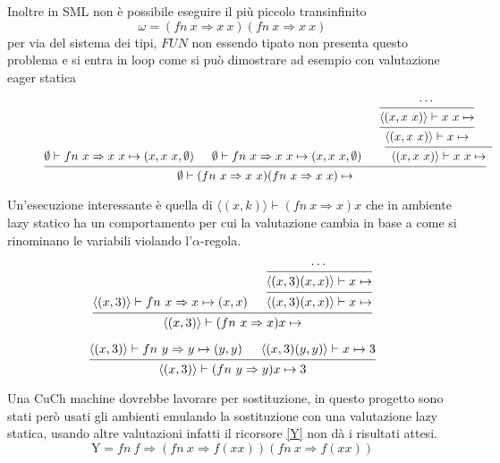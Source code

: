 \documentclass[a4paper]{article}
\begin{document}
	Inoltre in SML non è possibile eseguire il più piccolo transinfinito 
	\[ \omega = (fn \ x \Rightarrow x \ x)(fn \ x \Rightarrow x \ x) \]
	per via del sistema dei tipi, $FUN$ non essendo tipato non presenta questo problema e si entra in loop come si può dimostrare ad esempio con valutazione eager statica
	
	\begin{figure}[ht]
	\[
		\begin{prooftree}
			\hypo{\emptyset \vdash fn \ x \Rightarrow x \ x \mapsto (x, x \ x, \emptyset)}

			\hypo{\emptyset \vdash fn \ x \Rightarrow x \ x \mapsto (x, x \ x, \emptyset)}

			\hypo{\cdots}
			\infer1[]{\langle (x, x \ x) \rangle \vdash x \ x \mapsto}
			\infer1[]{\langle (x, x \ x) \rangle \vdash x \mapsto}
			\hypo{}
			\infer2[]{\langle (x, x \ x) \rangle \vdash x \ x \mapsto }

			\infer3[]{\emptyset \vdash (fn \ x \Rightarrow x \ x)(fn \ x \Rightarrow x \ x) \mapsto }

		\end{prooftree}
	\]
	\end{figure}
	
	Un'esecuzione interessante è quella di $\langle (x, k) \rangle \vdash (fn \ x \Rightarrow x)x$ che in ambiente lazy statico ha un comportamento per cui la valutazione cambia in base a come si rinominano le variabili violando l'$\alpha$-regola.  

	\begin{figure}[H]
	\[
		\begin{prooftree}
			\hypo{\langle (x,3) \rangle \vdash fn \ x \Rightarrow x \mapsto (x,x)}
			\hypo{\cdots}
			\infer1[]{\langle (x,3)(x,x) \rangle \vdash x \mapsto }
			\infer1[]{\langle (x,3)(x,x) \rangle \vdash x \mapsto }
			\infer2[]{\langle (x,3) \rangle \vdash (fn \ x \Rightarrow x) x \mapsto }
		\end{prooftree}
	\]
	\end{figure}


	\begin{figure}[H]
	\[
		\begin{prooftree}
			\hypo{\langle (x,3) \rangle \vdash fn \ y \Rightarrow y \mapsto (y,y)}
			\hypo{\langle (x,3)(y,y) \rangle \vdash x \mapsto 3}
			\infer2[]{\langle (x,3) \rangle \vdash (fn \ y \Rightarrow y)x \mapsto 3}
		\end{prooftree}
	\]
	\end{figure}

	Una CuCh machine dovrebbe lavorare per sostituzione, in questo progetto sono stati però usati gli ambienti emulando la sostituzione con una valutazione lazy statica, usando altre valutazioni infatti il ricorsore \eqref{Y} non dà i risultati attesi.
	\begin{equation} \label{Y}
	\mathrm{Y}= fn \ f \Rightarrow (fn \ x \Rightarrow f(xx))(fn \ x \Rightarrow f(xx))
	\end{equation}
\end{document}
